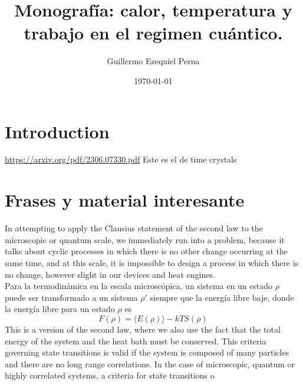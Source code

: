 \documentclass{article}
\title{Monografía: calor, temperatura y trabajo en el regimen cuántico.}
\author{Guillermo Ezequiel Perna}
\date{\today}
\def\be{\begin{equation}}
\def\te{\end{equation}}
\begin{document}
\maketitle

\section{Introduction}
\url{https://arxiv.org/pdf/2306.07330.pdf}
Este es el de time crystals

\section{Frases y material interesante}
In attempting to apply the Clausius statement of the second law to the microscopic or quantum scale, we immediately run into a problem, because it talks about cyclic processes in which there is no other change occurring at the same time, and at this scale, it is impossible to design a process in which there is no change, however slight in our devices and heat engines. \\
Para la termodinámica en la escala microscópica, un sistema en un estado $\rho$ puede ser transformado a un sistema $\rho'$ siempre que la energía libre baje, donde la energía libre para un estado $\rho$ es
\be
F\left( \rho \right) = \langle E\left(\rho\right)\rangle - kTS\left( \rho \right)
\te
This is a version of the second law, where we also use the fact that the total energy of the system and the heat bath must be conserved. This criteria governing state transitions is valid if the system is composed of many particles and there are no long range correlations. In the case of microscopic, quantum or highly correlated systems, a criteria for state transitions o \\
\end{document}

